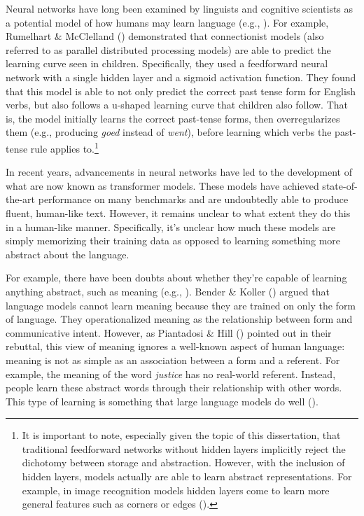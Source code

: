 \documentclass[
  12pt,
  letterpaper,
]{scrreport}
\begin{document}
Neural networks have long been examined by linguists and cognitive
scientists as a potential model of how humans may learn language (e.g.,
). For example, Rumelhart \& McClelland
() demonstrated
that connectionist models (also referred to as parallel distributed
processing models) are able to predict the learning curve seen in
children. Specifically, they used a feedforward neural network with a
single hidden layer and a sigmoid activation function. They found that
this model is able to not only predict the correct past tense form for
English verbs, but also follows a u-shaped learning curve that children
also follow. That is, the model initially learns the correct past-tense
forms, then overregularizes them (e.g., producing \emph{goed} instead of
\emph{went}), before learning which verbs the past-tense rule applies
to.\footnote{It is important to note, especially given the topic of this
  dissertation, that traditional feedforward networks without hidden
  layers implicitly reject the dichotomy between storage and
  abstraction. However, with the inclusion of hidden layers, models
  actually are able to learn abstract representations. For example, in
  image recognition models hidden layers come to learn more general
  features such as corners or edges
  ().}

In recent years, advancements in neural networks have led to the
development of what are now known as transformer models. These models
have achieved state-of-the-art performance on many benchmarks and are
undoubtedly able to produce fluent, human-like text. However, it remains
unclear to what extent they do this in a human-like manner.
Specifically, it's unclear how much these models are simply memorizing
their training data as opposed to learning something more abstract about
the language.

For example, there have been doubts about whether they're capable of
learning anything abstract, such as meaning (e.g.,
).
Bender \& Koller ()
argued that language models cannot learn meaning because they are
trained on only the form of language. They operationalized meaning as
the relationship between form and communicative intent. However, as
Piantadosi \& Hill
() pointed out
in their rebuttal, this view of meaning ignores a well-known aspect of
human language: meaning is not as simple as an association between a
form and a referent. For example, the meaning of the word \emph{justice}
has no real-world referent. Instead, people learn these abstract words
through their relationship with other words. This type of learning is
something that large language models do well
().
\end{document}
